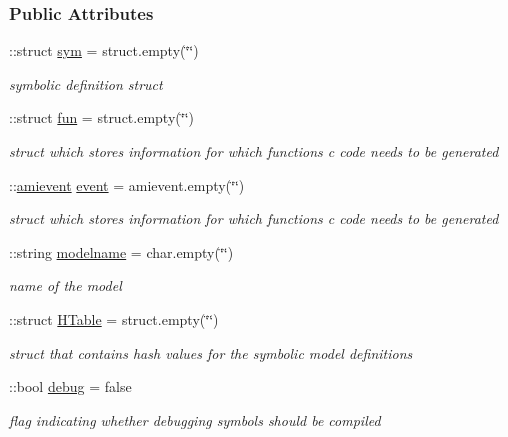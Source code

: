 \subsubsection*{Public Attributes}
\begin{DoxyCompactItemize}
\item 
\+::struct \mbox{\hyperlink{classamimodel_a3c48fff3d28406486a4f1b5e18da7ca6}{sym}} = struct.\+empty(\char`\"{}\char`\"{})
\begin{DoxyCompactList}\small\item\em symbolic definition struct \end{DoxyCompactList}\item 
\+::struct \mbox{\hyperlink{classamimodel_a743fa290dbc0a67a3843d5ab0426e9b4}{fun}} = struct.\+empty(\char`\"{}\char`\"{})
\begin{DoxyCompactList}\small\item\em struct which stores information for which functions c code needs to be generated \end{DoxyCompactList}\item 
\+::\mbox{\hyperlink{classamievent}{amievent}} \mbox{\hyperlink{classamimodel_a3b65133bb9997cd1ccf311af0927fc9e}{event}} = amievent.\+empty(\char`\"{}\char`\"{})
\begin{DoxyCompactList}\small\item\em struct which stores information for which functions c code needs to be generated \end{DoxyCompactList}\item 
\+::string \mbox{\hyperlink{classamimodel_a71bca9c21a6de42d8079ade31cb61044}{modelname}} = char.\+empty(\char`\"{}\char`\"{})
\begin{DoxyCompactList}\small\item\em name of the model \end{DoxyCompactList}\item 
\+::struct \mbox{\hyperlink{classamimodel_aafe6335df413dd688a2f44efba012cf1}{H\+Table}} = struct.\+empty(\char`\"{}\char`\"{})
\begin{DoxyCompactList}\small\item\em struct that contains hash values for the symbolic model definitions \end{DoxyCompactList}\item 
\+::bool \mbox{\hyperlink{classamimodel_a0514aabed091ee5e2f35766eb01eced6}{debug}} = false
\begin{DoxyCompactList}\small\item\em flag indicating whether debugging symbols should be compiled \end{DoxyCompactList}\item 

\end{DoxyCompactItemize}
